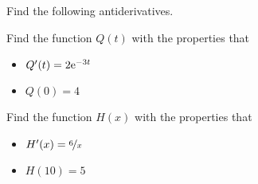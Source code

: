 
Find the following antiderivatives.

\begin{multicols}{2}
 \begin{ProblemSet}[pencil space=3.75in]
 \end{ProblemSet}
\end{multicols}

\begin{ProblemSet}[pencil space=3in]
 \begin{Problem}
  Find the function $Q(t)$ with the properties that
  \begin{itemize}
  \item $Q'(t) = 2 \mathrm{e}^{-3t}$
  \item $Q(0) = 4$
  \end{itemize}
 \end{Problem}
 \begin{Problem}
  Find the function $H(x)$ with the properties that
  \begin{itemize}
  \item $H'(x) = \nicefrac{6}{x}$
  \item $H(10) = 5$
  \end{itemize}
 \end{Problem}
\end{ProblemSet}

